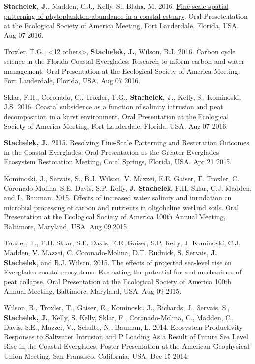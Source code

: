 \documentclass[11pt]{article}
\makeatletter
\newlength{\bibhang}
\newlength{\bibsep}
 {\@listi \global\bibsep\itemsep \global\advance\bibsep by\parsep}
\newenvironment{bibenum*}
  {\renewcommand\labelenumi{[\theenumi]}%
   \etaremune[
     topsep=0pt,
     itemsep=\bibsep,
     parsep=0pt,partopsep=0pt,
     itemindent=-\bibhang,
     leftmargin={\bibhang+\widthof{[999]}}]}
  {\endetaremune}
\makeatother
\begin{document}
\begin{bibenum*}
  \item \textbf{Stachelek, J.}, Madden, C.J., Kelly, S., Blaha, M. 2016. \href{http://doi.org/10.6084/m9.figshare.2775322.v4}{Fine-scale spatial patterning of phytoplankton abundance in a coastal estuary}. Oral Presetentation at the Ecological Society of America Meeting, Fort Lauderdale, Florida, USA. Aug 07 2016. 
  
    \item Troxler, T.G., <12 others>, \textbf{Stachelek, J.}, Wilson, B.J. 2016. Carbon cycle science in the Florida Coastal Everglades: Research to inform carbon and water management. Oral Presentation at the Ecological Society of America Meeting, Fort Lauderdale, Florida, USA. Aug 07 2016.
%   
    \item Sklar, F.H., Coronado, C., Troxler, T.G., \textbf{Stachelek, J.}, Kelly, S., Kominoski, J.S. 2016. Coastal subsidence as a function of salinity intrusion and peat decomposition in a karst environment. Oral Presentation at the Ecological Society of America Meeting, Fort Lauderdale, Florida, USA. Aug 07 2016.
%   
    \item \textbf{Stachelek, J.}. 2015. Resolving Fine-Scale Patterning and Restoration Outcomes in the Coastal Everglades. Oral Presentation at the Greater Everglades Ecosystem Restoration Meeting, Coral Springs, Florida, USA. Apr 21 2015. %
%   
    \item Kominoski, J., Servais, S., B.J. Wilson, V. Mazzei, E.E. Gaiser, T. Troxler, C. Coronado-Molina, S.E. Davis, S.P. Kelly, \textbf{J. Stachelek}, F.H. Sklar, C.J. Madden, and L. Bauman. 2015. Effects of increased water salinity and inundation on microbial processing of carbon and nutrients in oligohaline wetland soils. Oral Presentation at the Ecological Society of America 100th Annual Meeting, Baltimore, Maryland, USA. Aug 09 2015.
%   
    \item Troxler, T., F.H. Sklar, S.E. Davis, E.E. Gaiser, S.P. Kelly, J. Kominoski, C.J. Madden, V. Mazzei, C. Coronado-Molina, D.T. Rudnick, S. Servais, \textbf{J. Stachelek}, and B.J. Wilson. 2015. The effects of projected sea-level rise on Everglades coastal ecosystems: Evaluating the potential for and mechanisms of peat collapse. Oral Presentation at the Ecological Society of America 100th Annual Meeting, Baltimore, Maryland, USA. Aug 09 2015.
%   
    \item Wilson, B., Troxler, T., Gaiser, E., Kominoski, J., Richards, J., Servais, S., \textbf{Stachelek, J.}, Kelly, S. Kelly, Sklar, F., Coronado-Molina, C., Madden, C., Davis, S.E., Mazzei, V., Schulte, N., Bauman, L. 2014. Ecosystem Productivity Responses to Saltwater Intrusion and P Loading As a Result of Future Sea Level Rise in the Coastal Everglades. Poster Presentation at the American Geophysical Union Meeting, San Fransisco, California, USA. Dec 15 2014.
   

\end{bibenum*}
\end{document}
